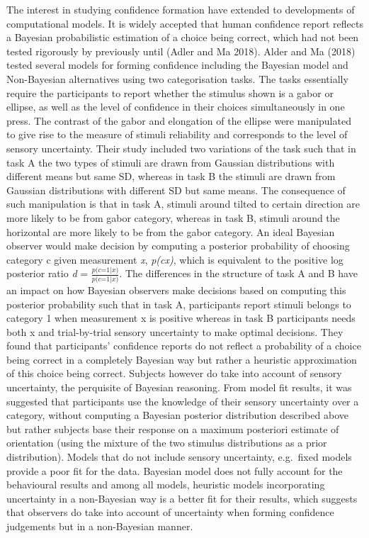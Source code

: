 \documentclass[
]{article}
\begin{document}
The interest in studying confidence formation have extended to
developments of computational models. It is widely accepted that human
confidence report reflects a Bayesian probabilistic estimation of a
choice being correct, which had not been tested rigorously by previously
until (Adler and Ma 2018). Alder and Ma (2018) tested several models for
forming confidence including the Bayesian model and Non-Bayesian
alternatives using two categorisation tasks. The tasks essentially
require the participants to report whether the stimulus shown is a gabor
or ellipse, as well as the level of confidence in their choices
simultaneously in one press. The contrast of the gabor and elongation of
the ellipse were manipulated to give rise to the measure of stimuli
reliability and corresponds to the level of sensory uncertainty. Their
study included two variations of the task such that in task A the two
types of stimuli are drawn from Gaussian distributions with different
means but same SD, whereas in task B the stimuli are drawn from Gaussian
distributions with different SD but same means. The consequence of such
manipulation is that in task A, stimuli around tilted to certain
direction are more likely to be from gabor category, whereas in task B,
stimuli around the horizontal are more likely to be from the gabor
category. An ideal Bayesian observer would make decision by computing a
posterior probability of choosing category c given measurement \emph{x},
\emph{p(c\textbar x)}, which is equivalent to the positive log posterior
ratio \emph{d} = \(\frac{\textit{p(c=1|x)} }{\textit{p(c=1|x)} }\). The
differences in the structure of task A and B have an impact on how
Bayesian observers make decisions based on computing this posterior
probability such that in task A, participants report stimuli belongs to
category 1 when measurement x is positive whereas in task B participants
needs both x and trial-by-trial sensory uncertainty to make optimal
decisions. They found that participants' confidence reports do not
reflect a probability of a choice being correct in a completely Bayesian
way but rather a heuristic approximation of this choice being correct.
Subjects however do take into account of sensory uncertainty, the
perquisite of Bayesian reasoning. From model fit results, it was
suggested that participants use the knowledge of their sensory
uncertainty over a category, without computing a Bayesian posterior
distribution described above but rather subjects base their response on
a maximum posteriori estimate of orientation (using the mixture of the
two stimulus distributions as a prior distribution). Models that do not
include sensory uncertainty, e.g.~fixed models provide a poor fit for
the data. Bayesian model does not fully account for the behavioural
results and among all models, heuristic models incorporating uncertainty
in a non-Bayesian way is a better fit for their results, which suggests
that observers do take into account of uncertainty when forming
confidence judgements but in a non-Bayesian manner.
\end{document}
